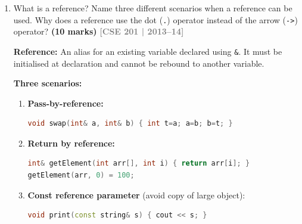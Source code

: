 \documentclass[12pt,a3paper]{article}
\newcommand{\yr}[1]{\hfill\textcolor{gray}{\small\textbf{[#1]}}}
\newcommand{\mk}[1]{\textcolor{orange!70!black}{\small\textbf{(#1 marks)}}}
\begin{document}
\begin{enumerate}
\begin{tcolorbox}
\begin{lstlisting}[language=C++]
int vals[3] = {10, 20, 30};
int& getVal(int i) { return vals[i]; }

int main() {
    getVal(1) = 99;           // sets vals[1] = 99
    cout << vals[1] << "\n";  // 99

    int v = getVal(2);        // r-value use: v = 30
    cout << v << "\n";        // 30
    return 0;
}
\end{lstlisting}

The returned reference is an alias to \texttt{vals[i]}, so assigning
to \texttt{getVal(1)} directly modifies the array element.

\end{tcolorbox}

\item What is a reference? Name three different scenarios when a reference can be used. Why does a reference use the dot (\texttt{.}) operator instead of the arrow (\texttt{->}) operator? \mk{10}
\yr{CSE 201 | 2013--14}


\begin{tcolorbox}[enhanced,breakable,ansbox,colback=cC!4,colframe=cC,
  boxrule=0.8pt,arc=5pt,
  title={\textbf{Answer --- Reference --- 3 scenarios, dot vs arrow}},
  fonttitle=\bfseries\color{white},colbacktitle=cC]

\textbf{Reference:} An alias for an existing variable declared using
\texttt{\&}.  It must be initialised at declaration and cannot be
rebound to another variable.

\medskip
\textbf{Three scenarios:}

\begin{enumerate}[label=\textbf{\arabic*.}]
  \item \textbf{Pass-by-reference:}
\begin{lstlisting}[language=C++]
void swap(int& a, int& b) { int t=a; a=b; b=t; }
\end{lstlisting}
  \item \textbf{Return by reference:}
\begin{lstlisting}[language=C++]
int& getElement(int arr[], int i) { return arr[i]; }
getElement(arr, 0) = 100;
\end{lstlisting}
  \item \textbf{Const reference parameter} (avoid copy of large object):
\begin{lstlisting}[language=C++]
void print(const string& s) { cout << s; }
\end{lstlisting}
\end{enumerate}


\end{tcolorbox}
\end{enumerate}
\end{document}
